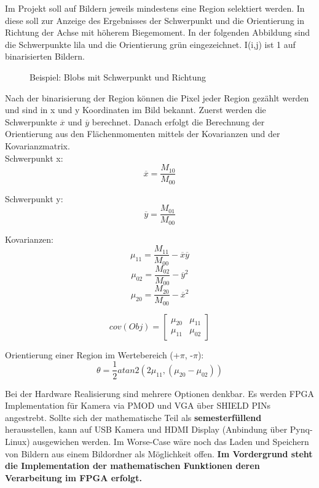 \documentclass[a4paper]{report}
\begin{document}
Im Projekt soll auf Bildern jeweils mindestens eine Region selektiert werden. In diese soll zur Anzeige des Ergebnisses der Schwerpunkt und die Orientierung in Richtung der Achse mit höherem Biegemoment. In der folgenden Abbildung sind die Schwerpunkte lila und die Orientierung grün eingezeichnet. I(i,j) ist 1 auf binarisierten Bildern.
	
	\begin{figure}[H]
	\centering
	\caption{Beispiel: Blobs mit Schwerpunkt und Richtung}
	\label{Entwurf des Projects}
	\end{figure}
	
Nach der binarisierung der Region können die Pixel jeder Region gezählt werden und sind in x und y Koordinaten im Bild bekannt. Zuerst werden die Schwerpunkte $\overline{x}$ und $\overline{y}$ berechnet. Danach erfolgt die Berechnung der Orientierung aus den Flächenmomenten mittels der Kovarianzen und der Kovarianzmatrix. \\

Schwerpunkt x: $$\overline{x} = \frac{M_{10}}{M_{00}}$$

Schwerpunkt y: $$\overline{y} = \frac{M_{01}}{M_{00}}$$

Kovarianzen: $$\mu_{11} = \frac{M_{11}}{M_{00}} - \overline{x}\overline{y} $$
			 $$\mu_{02} = \frac{M_{02}}{M_{00}} - \overline{y}^2 $$
			 $$\mu_{20} = \frac{M_{20}}{M_{00}} - \overline{x}^2 $$

     		$$cov(Obj) =\begin{bmatrix}
			 			\mu_{20} & \mu_{11}\\ 
				 		\mu_{11}& \mu_{02}
					 	\end{bmatrix}$$
			
			 
Orientierung einer Region im Wertebereich (+$\pi$, -$\pi$): $$ \theta = \frac{1}{2} atan2(2\mu_{11}, (\mu_{20}-\mu_{02}))    $$

Bei der Hardware Realisierung sind mehrere Optionen denkbar. Es werden FPGA Implementation für Kamera via PMOD und VGA über SHIELD PINs angestrebt. Sollte sich der mathematische Teil als \textbf{semesterfüllend} herausstellen, kann auf USB Kamera und HDMI Display (Anbindung über Pynq-Linux) ausgewichen werden. Im Worse-Case wäre noch das Laden und Speichern von Bildern aus einem Bildordner als Möglichkeit offen. \textbf{Im Vordergrund steht die Implementation der mathematischen Funktionen deren Verarbeitung im FPGA erfolgt.}
\end{document}
